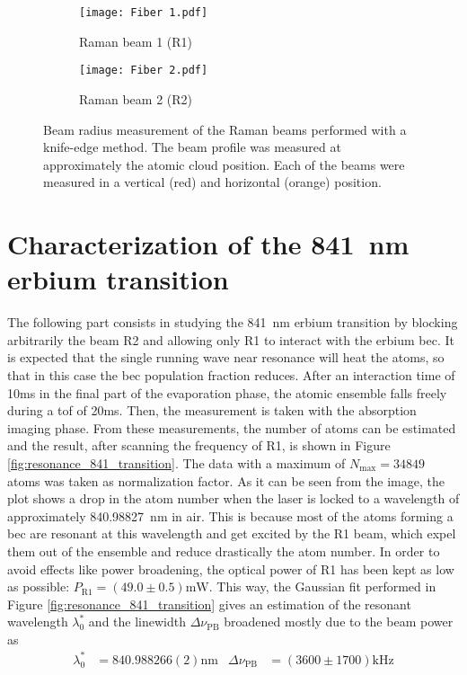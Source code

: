 \pagebreak

\begin{figure}
	\centering
	\begin{subfigure}{.5\textwidth}
		\centering
		\texttt{[image: Fiber 1.pdf]}
		\caption{Raman beam 1 (R1)}
		\label{fig:raman_beams_radius_1}
	\end{subfigure}%
	\begin{subfigure}{.5\textwidth}
		\centering
		\texttt{[image: Fiber 2.pdf]}
		\caption{Raman beam 2 (R2)}
		\label{fig:raman_beams_radius_2}
	\end{subfigure}
	\caption[Beam radius measurement of the Raman beams performed with a knife-edge method]{Beam radius measurement of the Raman beams performed with a knife-edge method. The beam profile was measured at approximately the atomic cloud position. Each of the beams were measured in a vertical (red) and horizontal (orange) position.}
	\label{fig:raman_beams_radius}
\end{figure}


\section{Characterization of the \SI{841}{\nano\meter} erbium transition}

The following part consists in studying the \SI{841}{\nano\meter} erbium transition by blocking arbitrarily the beam R2 and allowing only R1 to interact with the erbium \ac{bec}. It is expected that the single running wave near resonance will heat the atoms, so that in this case the \ac{bec} population fraction reduces. After an interaction time of 10\si{\milli\second} in the final part of the evaporation phase, the atomic ensemble falls freely during a \ac{tof} of 20\si{\milli\second}. Then, the measurement is taken with the absorption imaging phase. From these measurements, the number of atoms can be estimated and the result, after scanning the frequency of R1, is shown in Figure \ref{fig:resonance_841_transition}. The data with a maximum of $N_\text{max} = 34849$ atoms was taken as normalization factor. As it can be seen from the image, the plot shows a drop in the atom number when the laser is locked to a wavelength of approximately \SI{840.98827}{\nano\meter} in air. This is because most of the atoms forming a \ac{bec} are resonant at this wavelength and get excited by the R1 beam, which expel them out of the ensemble and reduce drastically the atom number. In order to avoid effects like power broadening, the optical power of R1 has been kept as low as possible: $P_{\text{R1}} = (49.0 \pm 0.5) \si{\milli\watt}$. This way, the Gaussian fit performed in Figure \ref{fig:resonance_841_transition} gives an estimation of the resonant wavelength $\lambda_0^*$ and the linewidth $\Delta\nu_{\text{PB}}$ broadened mostly due to the beam power as
\begin{align*}
	\lambda_0^* &= 840.988266(2)\si{\nano\meter}   &   \Delta\nu_{\text{PB}} &= (3600 \pm 1700)\si{\kilo\hertz}
\end{align*}

